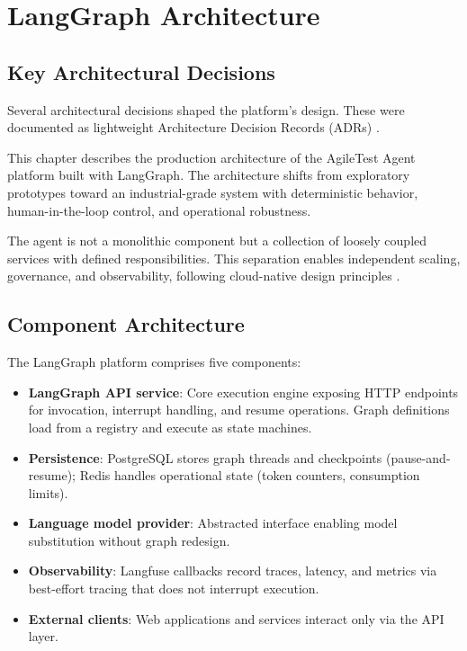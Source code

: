 \chapter{LangGraph Architecture}
\label{ch:LangGraphArchitecture}
\section{Key Architectural Decisions}
\label{sec:KeyArchDecisions}

Several architectural decisions shaped the platform's design. These were
documented as lightweight Architecture Decision Records (ADRs)
\cite{nygard2011adr}.

This chapter describes the production architecture of the AgileTest Agent
platform built with LangGraph. The architecture shifts from exploratory
prototypes toward an industrial-grade system with deterministic behavior,
human-in-the-loop control, and operational robustness.

The agent is not a monolithic component but a collection of loosely coupled
services with defined responsibilities. This separation enables independent
scaling, governance, and observability, following cloud-native design
principles \cite{googleSRE,microsoftWellArchitected}.

\section{Component Architecture}
\label{sec:ComponentArchitecture}

The LangGraph platform comprises five components:

\begin{itemize}
    \item \textbf{LangGraph API service}: Core execution engine exposing HTTP endpoints for invocation, interrupt handling, and resume operations. Graph definitions load from a registry and execute as state machines.\smallskip
    \item \textbf{Persistence}: PostgreSQL stores graph threads and checkpoints (pause-and-resume); Redis handles operational state (token counters, consumption limits).\smallskip
    \item \textbf{Language model provider}: Abstracted interface enabling model substitution without graph redesign.\smallskip
    \item \textbf{Observability}: Langfuse callbacks record traces, latency, and metrics via best-effort tracing that does not interrupt execution.\smallskip
    \item \textbf{External clients}: Web applications and services interact only via the API layer.
\end{itemize}

